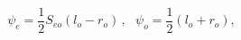 \begin{equation}
\psi _{e}={\frac{1}{2}}S_{eo}(l_{o}-r_{o})\,,~~~\psi _{o}={\frac{1}{2}}%
(l_{o}+r_{o}),  \label{eq:sinDN_lr2psi}
\end{equation}


